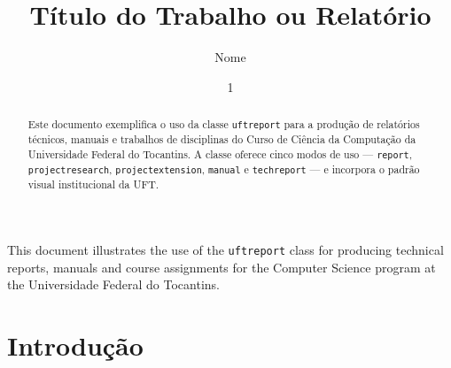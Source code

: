 \documentclass[techreport]{uftreport}
\title{Título do Trabalho ou Relatório}
\author{Nome}{Sobrenome}
\date{1}{6}{2026}   %
\begin{document}
\frontmatter        %

\maketitle          %

\makefrontpage      %
\newpage



\begin{abstract}
Este documento exemplifica o uso da classe \texttt{uftreport} para
a produção de relatórios técnicos, manuais e trabalhos de disciplinas
do Curso de Ciência da Computação da Universidade Federal do Tocantins.
A classe oferece cinco modos de uso --- \texttt{report},
\texttt{projectresearch}, \texttt{projectextension}, \texttt{manual}
e \texttt{techreport} --- e incorpora o padrão visual institucional da UFT.
\end{abstract}

\begin{foreignabstract}
This document illustrates the use of the \texttt{uftreport} class for
producing technical reports, manuals and course assignments for the
Computer Science program at the Universidade Federal do Tocantins.
\end{foreignabstract}

\tableofcontents
\listoffigures    %
\listoftables     %

\mainmatter         %


\chapter{Introdução}
\end{document}
